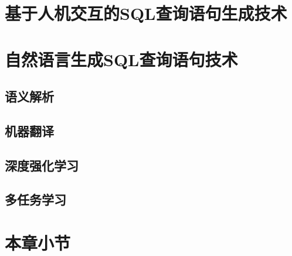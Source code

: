 \section{基于人机交互的SQL查询语句生成技术}

\section{自然语言生成SQL查询语句技术}
\subsection{语义解析}

\subsection{机器翻译}

\subsection{深度强化学习}

\subsection{多任务学习}

\section{本章小节}